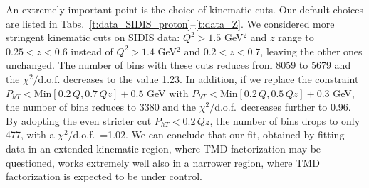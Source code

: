 \documentclass[aps,preprintnumbers,showpacs,nofootinbib,superscriptaddress,floatfix]{revtex4}
\newcommand{\compass}{\textsc{Compass}}
\begin{document}
An extremely important point is the choice of kinematic cuts. Our default
choices are listed in Tabs.~\ref{t:data_SIDIS_proton}--\ref{t:data_Z}. We
considered more stringent kinematic cuts on SIDIS data: 
$Q^2 > 1.5$ GeV$^2$ and $z$ range to 
$0.25 < z < 0.6$ instead of $Q^2 > 1.4$ GeV$^2$ and $0.2 < z <
0.7$, leaving the other ones unchanged. The number of bins with these cuts 
reduces from 8059 to 5679 and 
the  $\chi^2/ \text{d.o.f.}$  decreases to the
value 1.23. 
In addition, if we replace the constraint  $P_{h T} < \text{Min} [
0.2\, Q, 0.7\, Q z] + 0.5$ GeV  
with $P_{h T} < \text{Min} [ 0.2\, Q, 0.5\, Q z] +
0.3$ GeV, the number of bins reduces to 3380 and the $\chi^2/$d.o.f.\ decreases
further to 0.96. By adopting the even stricter 
cut $P_{h T} < 0.2\, Q z$, 
the number of bins drops to only 477, with  a 
 $\chi^2$/d.o.f.\ =1.02.  We can conclude that our fit, obtained by
 fitting data in an extended kinematic region, where TMD factorization may be
 questioned,  works extremely well also in a narrower
 region, where TMD factorization is expected to be under control.


%
%
\end{document}
